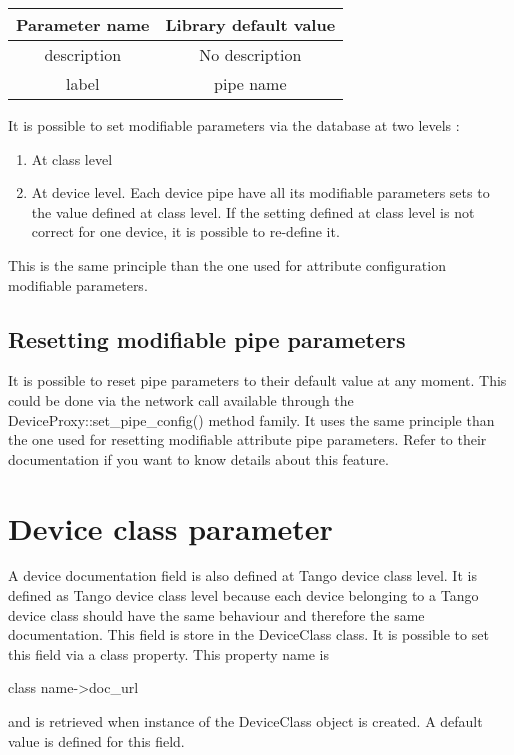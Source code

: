 \vspace{0.3cm}

\begin{center}
\begin{longtable}{|c|c|}
\hline 
Parameter name & Library default value\tabularnewline
\hline 
\hline 
description & \textquotedbl{}No description\textquotedbl{}\tabularnewline
\hline 
label & pipe name\tabularnewline
\hline 
\end{longtable}
\par\end{center}

\vspace{0.3cm}

It is possible to set modifiable parameters via the database at two
levels :
\begin{enumerate}
\item At class level
\item At device level. Each device pipe have all its modifiable parameters
sets to the value defined at class level. If the setting defined at
class level is not correct for one device, it is possible to re-define
it.
\end{enumerate}
This is the same principle than the one used for attribute configuration
modifiable parameters.

\subsection{Resetting modifiable pipe parameters}

It is possible to reset pipe parameters to their default value at
any moment. This could be done via the network call available through
the DeviceProxy::set\_pipe\_config() method family. It uses the same
principle than the one used for resetting modifiable attribute pipe
parameters. Refer to their documentation if you want to know details
about this feature.

\section{Device class parameter}

A device documentation field is also defined
at Tango device class level. It is defined as Tango device class level
because each device belonging to a Tango device class should have
the same behaviour and therefore the same documentation. This field
is store in the DeviceClass class. It is possible to set this field
via a class property. This property name is \begin{center}class name->doc\_url\end{center} and
is retrieved when instance of the DeviceClass object is created. A
default value is defined for this field.

